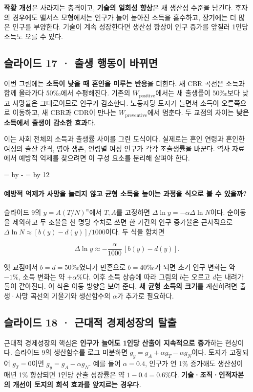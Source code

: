 \documentclass[10pt,a4paper]{article}
\newcommand{\ReserveQuestionSpace}{%
  \par\begingroup
  \dimen0=\pagegoal \advance\dimen0 by -\pagetotal
  \dimen2=\baselineskip \multiply\dimen2 by 12
  \ifdim\dimen0<\dimen2 \newpage\fi
  \endgroup}
\begin{document}
\textbf{작황 개선}은 사라지는 충격이고, \textbf{기술의 일회성 향상}은 새 생산성 수준을 남긴다. 후자의 경우에도 맬서스 모형에서는 인구가 늘어 높아진 소득을 흡수하고, 장기에는 더 많은 인구를 부양한다. 기술이 계속 성장한다면 생산성 향상이 인구 증가를 앞질러 1인당 소득도 오를 수 있다.\par

\subsection{슬라이드 17 · 출생 행동이 바뀌면}
이번 그림에는 \textbf{소득이 낮을 때 혼인을 미루는 반응}을 더한다. 새 CBR 곡선은 소득과 함께 올라가다 50‰에서 수평해진다. 기존의 $W_{\mathrm{positive}}$에서는 새 출생률이 50‰보다 낮고 사망률은 그대로이므로 인구가 감소한다. 노동자당 토지가 늘면서 소득이 오른쪽으로 이동하고, 새 CBR과 CDR이 만나는 $W_{\mathrm{preventive}}$에서 멈춘다. 두 교점의 차이는 \textbf{낮은 소득에서 출생이 감소한 효과}다.\par

이는 사회 전체의 소득과 출생률 사이를 그린 도식이다. 실제로는 혼인 연령과 혼인한 여성의 출산 간격, 영아 생존, 연령별 여성 인구가 각각 조출생률을 바꾼다. 역사 자료에서 예방적 억제를 찾으려면 이 구성 요소를 분리해 살펴야 한다.\par

\ReserveQuestionSpace
\paragraph{예방적 억제가 사망을 늘리지 않고 균형 소득을 높이는 과정을 식으로 볼 수 있을까?}

슬라이드 9의 $y=A(T/N)^\alpha$에서 $T,A$를 고정하면 $\Delta\ln y=-\alpha\Delta\ln N$이다. 순이동을 제외하고 두 조율을 천 명당 수치로 쓰면 한 기간의 인구 증가율은 근사적으로 $\Delta\ln N\approx[b(y)-d(y)]/1000$이다. 두 식을 합치면\par

\[
\Delta\ln y\approx-\frac{\alpha}{1000}\,[b(y)-d(y)].
\]

옛 교점에서 $b=d=50$‰였다가 만혼으로 $b=40$‰가 되면 초기 인구 변화는 약 $-1\%$, 소득 변화는 약 $+\alpha\%$다. 이후 소득 상승에 따라 그림의 $b$는 오르고 $d$는 내려가 둘이 같아진다. 이 식은 이동 방향을 보여 준다. \textbf{새 균형 소득의 크기}를 계산하려면 출생·사망 곡선의 기울기와 생산함수의 $\alpha$가 추가로 필요하다.\par

\subsection{슬라이드 18 · 근대적 경제성장의 탈출}
근대적 경제성장의 핵심은 \textbf{인구가 늘어도 1인당 산출이 지속적으로 증가}하는 현상이다. 슬라이드 9의 생산함수를 로그 미분하면 $g_y=g_A+\alpha g_T-\alpha g_N$이다. 토지가 고정되어 $g_T=0$이면 $g_y=g_A-\alpha g_N$. 예를 들어 $\alpha=0.4$, 인구가 연 1\% 증가해도 생산성이 매년 1\% 향상되면 1인당 산출 성장률은 약 $1-0.4=0.6\%$다. \textbf{기술·조직·인적자본의 개선이 토지의 희석 효과를 앞지르는 경우}다.\par
\end{document}
